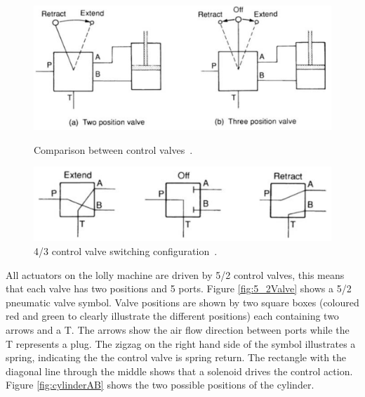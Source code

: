     \begin{figure}[H]
    \centering
    \begin{minipage}{0.45\textwidth}
        \centering
        \includegraphics[width = 1\textwidth]{2_images/controlValves.png}
        \caption{Comparison between control valves~\cite{parr2011hydraulics}.}
        \label{fig:controlValves}
    \end{minipage}\hfill
    \begin{minipage}{0.5\textwidth}
        \centering
        \includegraphics[width = 1\textwidth]{2_images/controlValveConfig.png}
        \caption{4/3 control valve switching configuration~\cite{parr2011hydraulics}.}
        \label{fig:controlValveConfig}
    \end{minipage}\hfill            
    \end{figure}      

    All actuators on the lolly machine are driven by 5/2 control valves, this means that each valve has two positions and 5 ports. Figure \ref{fig:5_2Valve} shows a 5/2 pneumatic valve symbol. Valve positions are shown by two square boxes (coloured red and green to clearly illustrate the different positions) each containing two arrows and a T. The arrows show the air flow direction between ports while the T represents a plug. The zigzag on the right hand side of the symbol illustrates a spring, indicating the the control valve is spring return. The rectangle with the diagonal line through the middle shows that a solenoid drives the control action. Figure \ref{fig:cylinderAB} shows the two possible positions of the cylinder.

